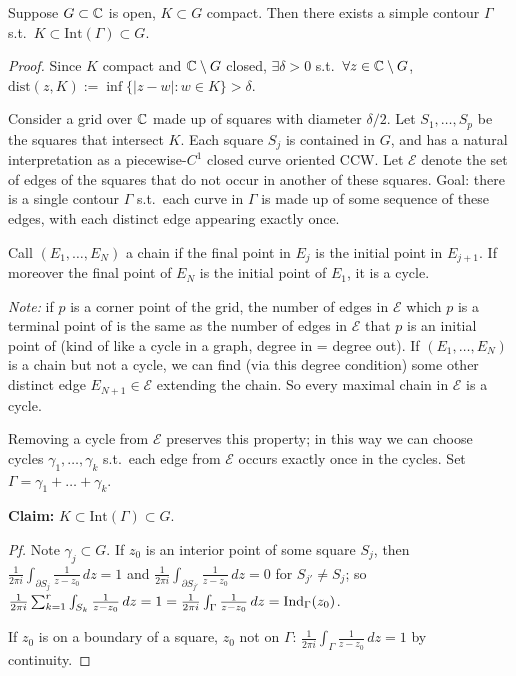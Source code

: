 \documentclass[11pt]{article}
\begin{document}
\begin{lemma}
Suppose $G\subset{\mathbb{C}}$ is open, $K\subset G$ compact. Then there exists a simple contour $\Gamma$ s.t.\ $K \subset \mathrm{Int}(\Gamma) \subset G$.
\end{lemma}
\begin{proof}
Since $K$ compact and ${\mathbb{C}}\setminus G$ closed, $\exists \delta>0$ s.t.\ $\forall z\in{\mathbb{C}}\setminus G$, $\mathrm{dist}(z,K) := \inf\{|z-w| : w\in K\} > \delta$.

Consider a grid over ${\mathbb{C}}$ made up of squares with diameter $\delta/2$. Let $S_1,\dots,S_p$ be the squares that intersect $K$. Each square $S_j$ is contained in $G$, and has a natural interpretation as a piecewise-$C^1$ closed curve oriented CCW. Let $\mathcal E$ denote the set of edges of the squares that do not occur in another of these squares. Goal: there is a single contour $\Gamma$ s.t.\ each curve in $\Gamma$ is made up of some sequence of these edges, with each distinct edge appearing exactly once.

Call $(E_1,\dots,E_N)$ a chain if the final point in $E_j$ is the initial point in $E_{j+1}$. If moreover the final point of $E_N$ is the initial point of $E_1$, it is a cycle.

\emph{Note:} if $p$ is a corner point of the grid, the number of edges in $\mathcal E$ which $p$ is a terminal point of is the same as the number of edges in $\mathcal E$ that $p$ is an initial point of (kind of like a cycle in a graph, degree in = degree out). If $(E_1,\dots,E_N)$ is a chain but not a cycle, we can find (via this degree condition) some other distinct edge $E_{N+1}\in\mathcal E$ extending the chain. So every maximal chain in $\mathcal E$ is a cycle.

Removing a cycle from $\mathcal E$ preserves this property; in this way we can choose cycles $\gamma_1,\dots,\gamma_k$ s.t.\ each edge from $\mathcal E$ occurs exactly once in the cycles. Set $\Gamma = \gamma_1+\dots+\gamma_k$.

\textbf{Claim:} $K \subset \mathrm{Int}(\Gamma) \subset G$.

\emph{Pf.} Note $\gamma_j\subset G$. If $z_0$ is an interior point of some square $S_j$, then $\frac{1}{2\pi i}\int_{\partial S_j} \frac{1}{z-z_0}\,dz=1$ and $\frac{1}{2\pi i}\int_{\partial S_{j'}}\frac{1}{z-z_0}\,dz=0$ for $S_{j'}\ne S_j$; so $\frac{1}{2\pi i}\sum_{k=1}^r\int_{S_k}\frac{1}{z-z_0}\,dz=1 = \frac{1}{2\pi i}\int_\Gamma \frac{1}{z-z_0}\,dz = \operatorname{Ind}_\Gamma(z_0)$.

If $z_0$ is on a boundary of a square, $z_0$ not on $\Gamma$: $\frac{1}{2\pi i}\int_\Gamma \frac{1}{z-z_0}\,dz=1$ by continuity.


\end{proof}
\end{document}
